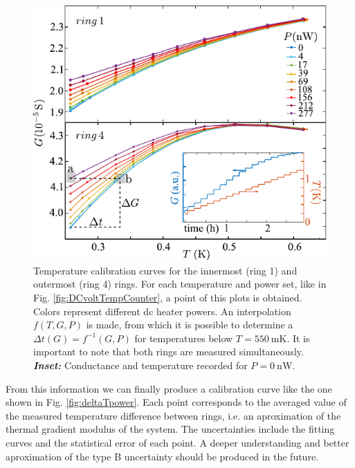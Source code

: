 \begin{figure}
    \centering
    \includegraphics[width=1\textwidth]{figures/temperature_corbino/fig5_calT.pdf}
    \caption{Temperature calibration curves for the innermost (ring 1) and outermost (ring 4) rings. For each temperature and power set, like in Fig. \ref{fig:DCvoltTempCounter}, a point of this plots is obtained. Colors represent different dc heater powers. An interpolation $f(T, G, P)$ is made, from which it is possible to determine a $\Delta t (G) = f^{-1}(G,P)$ for temperatures below $T = \SI{550}{\milli\kelvin}$. It is important to note that both rings are measured simultaneously. \textbf{\textit{Inset:}} Conductance and temperature recorded for $P = \SI{0}{\nano\watt}$.}
    \label{fig:calT}
\end{figure}

From this information we can finally produce a calibration curve like the one shown in Fig. \ref{fig:deltaTpower}. Each point corresponds to the averaged value of the measured temperature difference between rings, i.e. an aproximation of the thermal gradient modulus of the system. The uncertainties include the fitting curves and the statistical error of each point. A deeper understanding and better aproximation of the type B \cite{gum2008} uncertainty should be produced in the future. 

